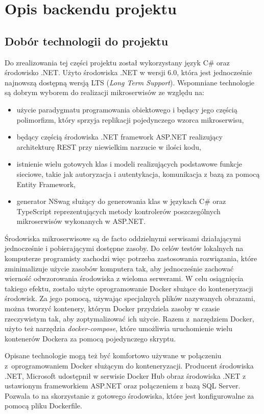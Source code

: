 \documentclass{SGGW-thesis}
\begin{document}
\chapter{Opis backendu projektu}
\section{Dobór technologii do projektu}
Do zrealizowania tej części projektu został wykorzystany język C\# oraz środowisko .NET. Użyto środowiska .NET w wersji 6.0, która jest jednocześnie najnowszą dostępną wersją LTS (\textit{Long Term Support}). Wspomniane technologie są dobrym wyborem do realizacji mikroserwisów ze względu na:

\begin{itemize}
	\item użycie paradygmatu programowania obiektowego i będący jego częścią polimorfizm, który sprzyja replikacji pojedynczego wzorca mikroserwisu,
	\item będący częścią środowiska .NET framework ASP.NET realizujący architekturę REST przy niewielkim narzucie w ilości kodu,
	\item istnienie wielu gotowych klas i modeli realizujących podstawowe funkcje sieciowe, takie jak autoryzacja i autentykacja, komunikacja z bazą za pomocą Entity Framework,
	\item generator NSwag służący do generowania klas w językach C\# oraz TypeScript reprezentujących metody kontrolerów poszczególnych mikroserwisów wykonanych w ASP.NET.
\end{itemize}

Środowiska mikroserwisowe są de facto oddzielnymi serwisami działającymi jednocześnie i pobierającymi dostępne zasoby. Do celów testów lokalnych na komputerze programisty zachodzi więc potrzeba zastosowania rozwiązania, które zminimalizuje użycie zasobów komputera tak, aby jednocześnie zachować wierność odwzorowania środowiska z wieloma serwerami. W celu osiągnięcia takiego efektu, zostało użyte oprogramowanie Docker służące do konteneryzacji środowisk. Za jego pomocą, używając specjalnych plików nazywanych obrazami, można tworzyć kontenery, którym Docker przydziela zasoby w czasie rzeczywistym tak, aby zoptymalizować ich użycie.
Razem z~narzędziem Docker, użyto też narzędzia \textit{docker-compose}, które umożliwia uruchomienie wielu kontenerów Dockera za pomocą pojedynczego skryptu.

Opisane technologie mogą też być komfortowo używane w połączeniu z~oprogramowaniem Docker służącym do konteneryzacji. Producent środowiska .NET, Microsoft udostępnił w serwisie Docker Hub obraz środowiska .NET z ustawionym frameworkiem ASP.NET oraz połączeniem z bazą SQL Server. Pozwala to na skorzystanie z gotowego środowiska, które jest konfigurowalne za pomocą pliku Dockerfile.
\end{document}
